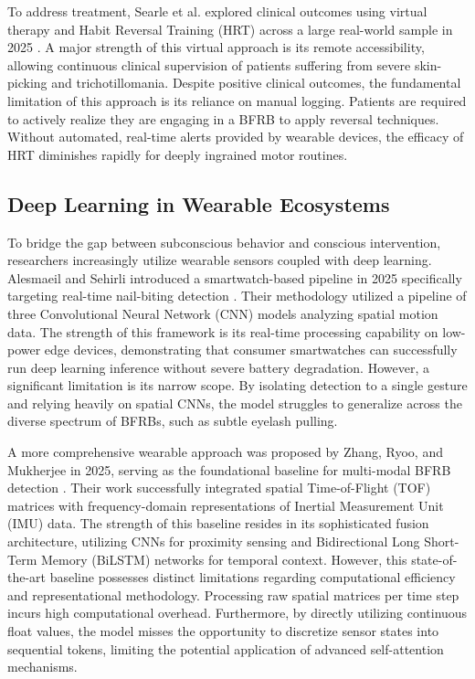 \documentclass[conference]{IEEEtran}
\begin{document}
To address treatment, Searle et al. explored clinical outcomes using virtual therapy and Habit Reversal Training (HRT) across a large real-world sample in 2025 \cite{searle2025virtual}. A major strength of this virtual approach is its remote accessibility, allowing continuous clinical supervision of patients suffering from severe skin-picking and trichotillomania. Despite positive clinical outcomes, the fundamental limitation of this approach is its reliance on manual logging. Patients are required to actively realize they are engaging in a BFRB to apply reversal techniques. Without automated, real-time alerts provided by wearable devices, the efficacy of HRT diminishes rapidly for deeply ingrained motor routines.

\subsection{Deep Learning in Wearable Ecosystems}
To bridge the gap between subconscious behavior and conscious intervention, researchers increasingly utilize wearable sensors coupled with deep learning. Alesmaeil and Sehirli introduced a smartwatch-based pipeline in 2025 specifically targeting real-time nail-biting detection \cite{alesmaeil2025nail}. Their methodology utilized a pipeline of three Convolutional Neural Network (CNN) models analyzing spatial motion data. The strength of this framework is its real-time processing capability on low-power edge devices, demonstrating that consumer smartwatches can successfully run deep learning inference without severe battery degradation. However, a significant limitation is its narrow scope. By isolating detection to a single gesture and relying heavily on spatial CNNs, the model struggles to generalize across the diverse spectrum of BFRBs, such as subtle eyelash pulling.

A more comprehensive wearable approach was proposed by Zhang, Ryoo, and Mukherjee in 2025, serving as the foundational baseline for multi-modal BFRB detection \cite{zhang2025detection}. Their work successfully integrated spatial Time-of-Flight (TOF) matrices with frequency-domain representations of Inertial Measurement Unit (IMU) data. The strength of this baseline resides in its sophisticated fusion architecture, utilizing CNNs for proximity sensing and Bidirectional Long Short-Term Memory (BiLSTM) networks for temporal context. However, this state-of-the-art baseline possesses distinct limitations regarding computational efficiency and representational methodology. Processing raw spatial matrices per time step incurs high computational overhead. Furthermore, by directly utilizing continuous float values, the model misses the opportunity to discretize sensor states into sequential tokens, limiting the potential application of advanced self-attention mechanisms.
\end{document}
